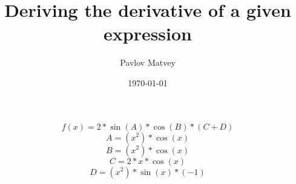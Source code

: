 \documentclass[12pt, letterpaper]{article}
\title {Deriving the derivative of a given expression}
\author{Pavlov Matvey}
\date{\today}
\begin{document}
\maketitle
\[f(x)=2*\sin(A)*\cos(B)*(C+D)\]
\[A=(x^2)*\cos(x)\]
\[B=(x^2)*\cos(x)\]
\[C=2*x*\cos(x)\]
\[D=(x^2)*\sin(x)*(-1)\]
\end{document}
